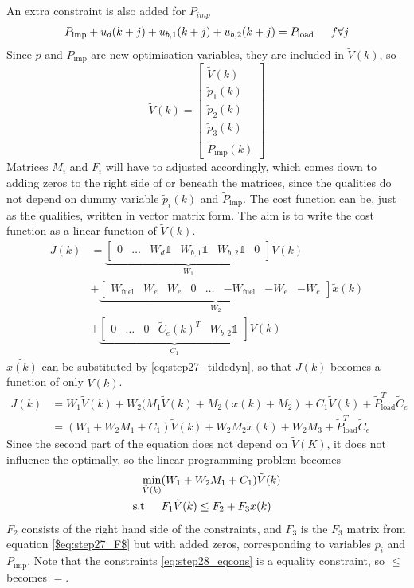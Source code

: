 An extra constraint is also added for $P_{imp}$
\begin{align}
P_{\text{imp}} + u_d(k+j) + u_{b,1}(k+j) + u_{b,2}(k+j) = P_{\text{load}} \indent f\forall j\label{eq:step28_eqcons}
\end{align}
Since $p$ and $P_{\text{imp}}$ are new optimisation variables, they are included in $\tilde{V}(k)$, so 
$$\tilde{V}(k) = \begin{bmatrix} \tilde{V}(k) \\ \tilde{p}_1(k) \\ \tilde{p}_2(k) \\ \tilde{p}_3(k)\\ \tilde{P}_{\text{imp}}(k) \end{bmatrix}$$
Matrices $M_i$ and $F_i$ will have to adjusted accordingly, which comes down to adding zeros to the right side of or beneath the matrices, since the qualities do not depend on dummy variable $\tilde{p}_i(k)$ and $\tilde{P}_{\text{imp}}$. The cost function can be, just as the qualities, written in vector matrix form. The aim is to write the cost function as a linear function of $\tilde{V}(k)$.
\begin{align*}
    J(k) &= \underbrace{\begin{bmatrix} 0 & \dots  & W_d\mathbb{1} & W_{b,1}\mathbb{1} & W_{b,2}\mathbb{1} & 0\end{bmatrix}}_{W_1} \tilde{V}(k)\\
    &+ \underbrace{\begin{bmatrix} W_{\text{fuel}} & W_e  & W_e & 0 & \dots &  -W_{\text{fuel}} & -W_e  & -W_e\end{bmatrix}}_{W_2} \tilde{x}(k) \\
    &+ \underbrace{\begin{bmatrix} 0 & \dots  & 0 & \tilde{C}_e(k)^T & W_{b,2}\mathbb{1} \end{bmatrix}}_{C_1}\tilde{V}(k)
\end{align*}
$\tilde{x(k)}$ can be substituted by \ref{eq:step27_tildedyn}, so that $J(k)$ becomes a function of only $\tilde{V}(k)$.
\begin{align*}
    J(k) &= W_1\tilde{V}(k) + W_2(M_1\tilde{V}(k)+M_2(x(k)+M_2) + C_1\tilde{V}(k) + \tilde{P}_{\text{load}}^T\tilde{C}_e\\
    &= (W_1 + W_2M_1 + C_1)\tilde{V}(k) + W_2M_2x(k) + W_2M_3 + \tilde{P}_{\text{load}}^T\tilde{C}_e
\end{align*}
Since the second part of the equation does not depend on $\tilde{V}(K)$, it does not influence the optimally, so the linear programming problem becomes
\begin{align*}
    \min_{\tilde{V}(k)} &(W_1 + W_2M_1 + C_1)\tilde{V}(k)\\
    \text{s.t} \indent &F_1\tilde{V}(k) \leq F_2 + F_3x(k)
\end{align*}
$F_2$ consists of the right hand side of the constraints, and $F_3$ is the $F_3$ matrix from equation \ref{$eq:step27_F$} but with added zeros, corresponding to variables $p_i$ and $P_{\text{imp}}$. Note that the constraints \ref{eq:step28_eqcons} is a equality constraint, so $\leq$ becomes $=$.

